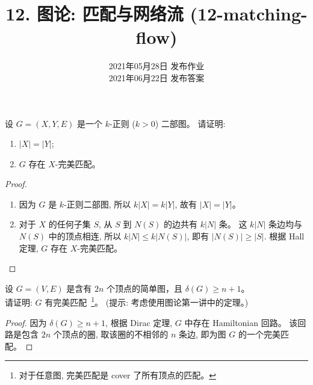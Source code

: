 \documentclass[a4paper, justified]{tufte-handout}
\title{12. 图论: 匹配与网络流 (12-matching-flow)}
\date{2021年05月28日 发布作业 \\ 2021年06月22日 发布答案}
\begin{document}
\maketitle
\noplagiarism %
\begin{abstract}
\end{abstract}
\beginrequired

\begin{problem}[\score{5 = 2 + 3} $\star\star$]
  设 $G = (X, Y, E)$ 是一个 $k$-正则 ($k > 0$) 二部图。
  请证明:
  \begin{enumerate}[(1)]
    \item $|X| = |Y|$;
    \item $G$ 存在 $X$-完美匹配。
  \end{enumerate}
\end{problem}

\begin{proof}
  \begin{enumerate}[(1)]
    \item 因为 $G$ 是 $k$-正则二部图, 所以 $k |X| = k |Y|$, 故有 $|X| = |Y|$。
    \item 对于 $X$ 的任何子集 $S$, 从 $S$ 到 $N(S)$ 的边共有 $k|N|$ 条。
      这 $k|N|$ 条边均与 $N(S)$ 中的顶点相连, 所以 $k|N| \le k|N(S)|$,
      即有 $|N(S)| \ge |S|$.
      根据 Hall 定理, $G$ 存在 $X$-完美匹配。
  \end{enumerate}
\end{proof}

\begin{problem}
  设 $G = (V, E)$ 是含有 $2n$ 个顶点的简单图，且 $\delta(G) \ge n + 1$。\\
  请证明: $G$ 有完美匹配~\footnote{对于任意图, 完美匹配是 cover 了所有顶点的匹配。}。
  (提示: 考虑使用图论第一讲中的定理。)
\end{problem}

\begin{proof}
  因为 $\delta(G) \ge n + 1$,
  根据 Dirac 定理, $G$ 中存在 Hamiltonian 回路。
  该回路是包含 $2n$ 个顶点的圈, 取该圈的不相邻的 $n$ 条边,
  即为图 $G$ 的一个完美匹配。
\end{proof}
\end{document}
